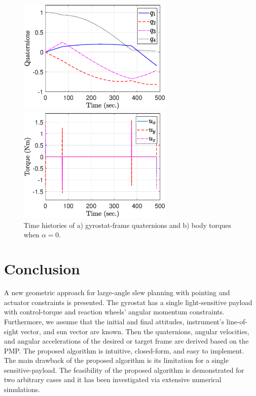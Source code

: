 \documentclass[journal ]{new-aiaa}
\begin{document}
\begin{figure}[htb!]
    \centering
    \begin{minipage}{.5\textwidth}
        \centering
\includegraphics[width=3in]{figures/alpha0/quats.eps}
    \end{minipage}%
    \begin{minipage}{0.5\textwidth}
        \centering
\includegraphics[width=3in]{figures/alpha0/torque.eps}
    \end{minipage}
    \caption{Time histories of a) gyrostat-frame quaternions and b) body torques when $\alpha=0$.}
    \label{fig:quats_phi_total0}
	\end{figure}
			
	
			
	\newpage
	\section{Conclusion}
	 A new geometric approach for large-angle slew planning with pointing and actuator constraints is presented. The gyrostat has a single light-sensitive payload with control-torque and reaction wheels' angular momentum constraints. Furthermore, we assume that the initial and final attitudes, instrument's line-of-sight vector, and sun vector are known. Then the quaternions, angular velocities, and angular accelerations of the desired or target frame are derived based on the PMP.  The proposed algorithm is intuitive, closed-form, and easy to implement. The main drawback of the proposed algorithm is its limitation for a single sensitive-payload. The feasibility of the proposed algorithm is demonstrated for two arbitrary cases and it has been investigated via extensive numerical simulations.
\end{document}
